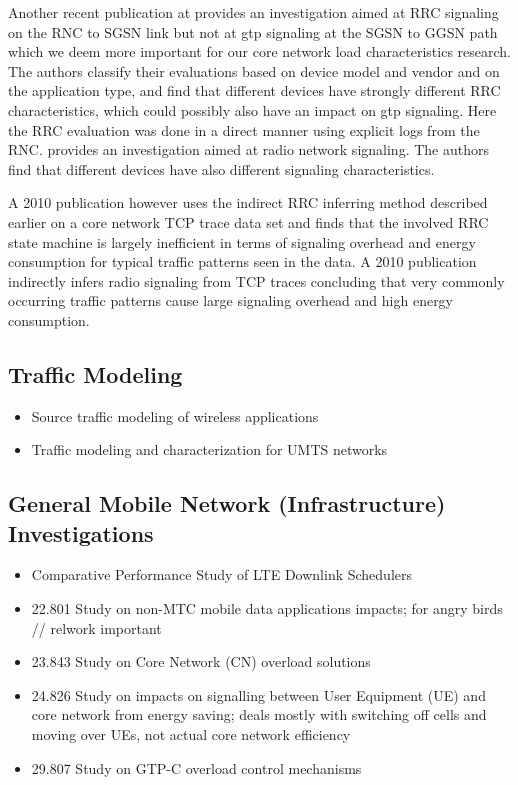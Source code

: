 Another recent publication at \cite{he2012panoramic} provides an investigation aimed at \gls{RRC} signaling on the \gls{RNC} to \gls{SGSN} link but not at \gls{gtp} signaling at the \gls{SGSN} to \gls{GGSN} path which we deem more important for our core network load characteristics research. The authors classify their evaluations based on device model and vendor and on the application type, and find that different devices have strongly different \gls{RRC} characteristics, which could possibly also have an impact on \gls{gtp} signaling. Here the \gls{RRC} evaluation was done in a direct manner using explicit logs from the \gls{RNC}. 
 \cite{he2012panoramic} provides an investigation aimed at radio network signaling. The authors find that different devices have also different signaling characteristics.


A 2010 publication\cite{Qian:2010:CRR:1879141.1879159} however uses the indirect \gls{RRC} inferring method described earlier on a core network TCP trace data set and finds that the involved \gls{RRC} state machine is largely inefficient in terms of signaling overhead and energy consumption for typical traffic patterns seen in the data.
A 2010 publication \cite{Qian:2010:CRR:1879141.1879159} indirectly infers radio signaling from TCP traces concluding that very commonly occurring traffic patterns cause large signaling overhead and high energy consumption.


\subsection{Traffic Modeling}

\begin{itemize}
	\item Source traffic modeling of wireless applications \cite{staehle2000source}
	\item Traffic modeling and characterization for UMTS networks \cite{965876}
\end{itemize}



\subsection{General Mobile Network (Infrastructure) Investigations}
\begin{itemize}
	\item Comparative Performance Study of LTE Downlink Schedulers \cite{biernacki2013ltescheduler}
	
	\item 22.801 \cite{3gpp.22.801} Study on non-MTC mobile data applications impacts; for angry birds // relwork important
	\item 23.843 \cite{3gpp.23.843} Study on Core Network (CN) overload solutions
	\item 24.826 \cite{3gpp.24.826} Study on impacts on signalling between User Equipment (UE) and core network from energy saving; deals mostly with switching off cells and moving over UEs, not actual core network efficiency
	\item 29.807 \cite{3gpp.29.807} Study on GTP-C overload control mechanisms
\end{itemize}

